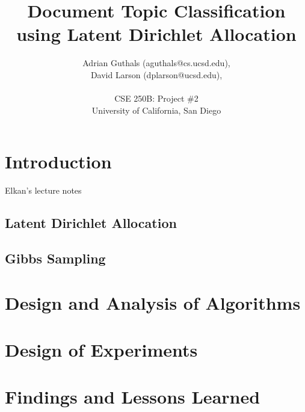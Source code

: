 \documentclass[10pt]{article}
\title{Document Topic Classification using Latent Dirichlet Allocation}
\author{Adrian Guthals (aguthals@cs.ucsd.edu),\\
David Larson (dplarson@ucsd.edu),\\
\\
CSE 250B: Project \#2 \\
University of California, San Diego \\
}
\begin{document}
\maketitle


\begin{abstract}
\end{abstract}



\section{Introduction}
\label{sec:intro}


Elkan's lecture notes \cite{CSE250B}

\subsection{Latent Dirichlet Allocation}
\label{sec:lda}



\subsection{Gibbs Sampling}
\label{sec:gibbs}




\section{Design and Analysis of Algorithms}
\label{sec:algorithms}



\section{Design of Experiments}
\label{sec:experiments}



\section{Findings and Lessons Learned}
\label{sec:conclusion}






\end{document}
